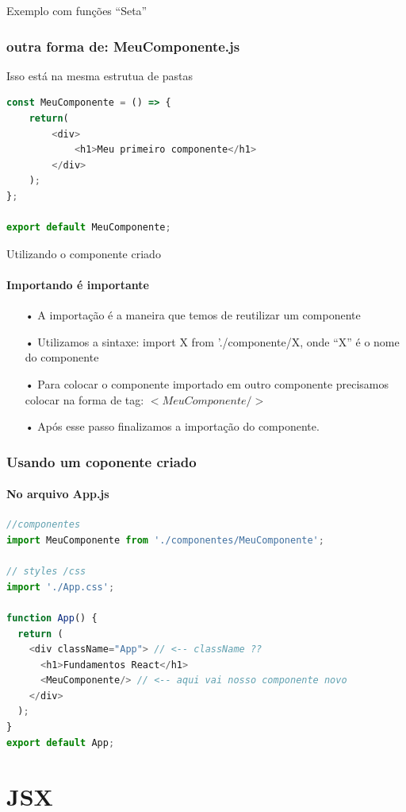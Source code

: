 \documentclass[13pt, xcolor={dvipsnames,svgnames}, portuguese]{beamer}
\begin{document}
\begin{frame}[fragile]{Exemplo com funções ``Seta''}
\frametitle{outra forma de: MeuComponente.js}
Isso está na mesma estrutua de pastas
\begin{lstlisting}[language=JavaScript]
const MeuComponente = () => {
    return(
        <div>
            <h1>Meu primeiro componente</h1>
        </div>
    );
};

export default MeuComponente;
\end{lstlisting}
\end{frame}




\begin{frame}{Utilizando o componente criado}
\framesubtitle{Importando é importante}
\begin{itemize}
	\item[•] A importação é a maneira que temos de reutilizar um componente
	\pause
	\item[•] Utilizamos a sintaxe: import X from './componente/X, onde ``X'' é o nome do componente
	\pause
	\item[•] Para colocar o componente importado em outro componente precisamos colocar na forma de tag: $<MeuComponente/>$
	\pause
	\item[•] Após esse passo finalizamos a importação do componente.

\end{itemize}
\end{frame}



\begin{frame}[fragile]
\frametitle{Usando um coponente criado}
\framesubtitle{No arquivo App.js}
\begin{lstlisting}[language=JavaScript]
//componentes
import MeuComponente from './componentes/MeuComponente';

// styles /css
import './App.css';

function App() {
  return (
    <div className="App"> // <-- className ??
      <h1>Fundamentos React</h1>
      <MeuComponente/> // <-- aqui vai nosso componente novo
    </div>
  );
}
export default App;
\end{lstlisting}
\end{frame}

\section{JSX}
\end{document}
